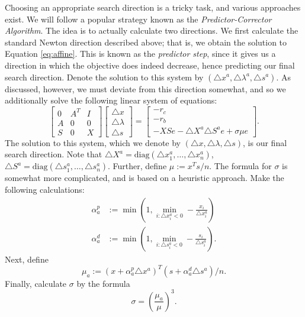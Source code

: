 Choosing an appropriate search direction is a tricky task, and various approaches exist. We will follow a popular strategy 
known as the \emph{Predictor-Corrector Algorithm}. The idea is to actually calculate two directions. We first calculate 
the standard Newton direction described above; that is, we obtain the solution to Equation \ref{eq:affine}. This is known as
the \emph{predictor step}, since it gives us a direction in which the objective does indeed decrease, hence predicting our
final search direction. Denote the solution to this system by $(\triangle x^a, \triangle \lambda^a, \triangle s^a)$.
As discussed, however, we must deviate from this direction somewhat, and so we additionally solve the
following linear system of equations:
\begin{equation}
\begin{bmatrix}
0 & A^T & I\\
A & 0 & 0\\
S & 0 & X
\end{bmatrix}
\begin{bmatrix}
\triangle x\\
\triangle \lambda\\
\triangle s
\end{bmatrix}
=
\begin{bmatrix}
-r_c\\
-r_b\\
-XSe - \triangle X^a\triangle S^ae + \sigma \mu e
\end{bmatrix}.
\label{eq:centering}
\end{equation}
The solution to this system, which we denote by $(\triangle x, \triangle \lambda, \triangle s)$, is our final search direction.
Note that $\triangle X^a = \text{diag}(\triangle x_1^a,\ldots,\triangle x_n^a)$, $\triangle S^a = \text{diag}(\triangle s_1^a,\ldots,\triangle s_n^a)$. Further, define $\mu := x^Ts/n$. The formula for $\sigma$ is somewhat more complicated, and
is based on a heuristic approach. Make the following calculations:
\begin{align*}
\alpha_a^p &:= \min\left(1, \displaystyle\min_{i : \triangle x_i^a < 0}-\frac{x_i}{\triangle x_i^a}\right)\\
\alpha_a^d &:= \min\left(1, \displaystyle\min_{i : \triangle s_i^a < 0}-\frac{s_i}{\triangle s_i^a}\right).
\end{align*}
Next, define
$$
\mu_a := (x+\alpha_a^p\triangle x^a)^T(s+\alpha_a^d\triangle s^a)/n.
$$
Finally, calculate $\sigma$ by the formula
$$
\sigma = \left(\frac{\mu_a}{\mu}\right)^3.
$$

